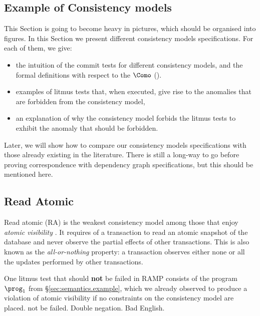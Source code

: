 \subsection{Example of Consistency models}
\label{sec:example-commit-test}
\ac{This Section is going to become heavy in pictures, which should be organised into figures.}
In this Section we present different consistency models specifications. 
For each of them, we give: 
\begin{itemize}
\item the intuition of the commit tests for different consistency models, and the formal definitions with respect to the \(\Como\) ().
\item examples of litmus tests that, when executed, give rise to the anomalies that are forbidden from the consistency model, 
\item an explanation of why the consistency model forbids the litmus tests to exhibit the anomaly that should be forbidden. 
\end{itemize}
Later, we will show how to compare our consistency models specifications with those already existing in the 
literature.
\ac{There is still a long-way to go before proving correspondence with dependency graph specifications, 
but this should be mentioned here.}


\subsection{Read Atomic} 
Read atomic (RA) \cite{ramp} is the weakest consistency model among those that enjoy \emph{atomic visibility} \cite{framework-concur}. 
It requires of a transaction to read an atomic snapshot of the database and never observe the partial effects of other transactions.
This is also known as the \emph{all-or-nothing} property: a transaction observes either none or all the updates performed by other transactions. 

One litmus test that should \textbf{not} be failed in RAMP consists of the program $\prog_1$ from \S \ref{sec:semantics.example}, which we already observed to produce a violation of atomic visibility if no constraints on the consistency model are placed.
\ac{not be failed. Double negation. Bad English.}

